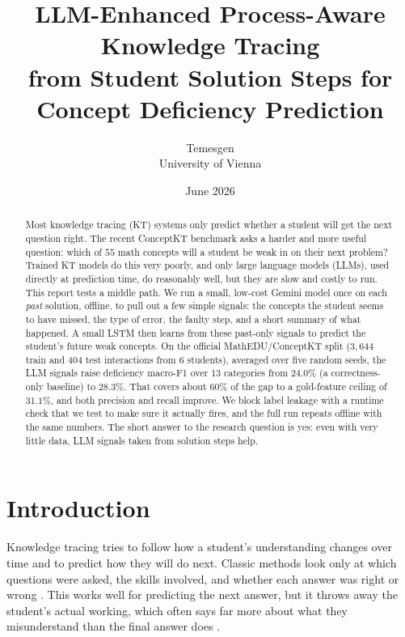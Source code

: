 \documentclass[11pt]{article}
\title{\bfseries LLM-Enhanced Process-Aware Knowledge Tracing\\
from Student Solution Steps for Concept Deficiency Prediction}
\author{Temesgen\\[2pt]
\normalsize University of Vienna}
\date{June 2026}
\begin{document}
\maketitle

\begin{abstract}
\noindent
Most knowledge tracing (KT) systems only predict whether a student will get the
next question right. The recent ConceptKT benchmark asks a harder and more useful
question: which of $55$ math concepts will a student be weak in on their next
problem? Trained KT models do this very poorly, and only large language models
(LLMs), used directly at prediction time, do reasonably well, but they are slow and
costly to run. This report tests a middle path. We run a small, low-cost Gemini model once on each
\emph{past} solution, offline, to pull out a few simple signals: the concepts the
student seems to have missed, the type of error, the faulty step, and a short
summary of what happened. A small LSTM then learns from these past-only signals to
predict the student's future weak concepts. On the official MathEDU/ConceptKT split
($3{,}644$ train and $404$ test interactions from $6$ students), averaged over five
random seeds, the LLM signals raise deficiency macro-F1 over $13$ categories from
$24.0\%$ (a correctness-only baseline) to $28.3\%$. That covers about $60\%$ of the
gap to a gold-feature ceiling of $31.1\%$, and both precision and recall improve. We
block label leakage with a runtime check that we test to make sure it actually fires,
and the full run repeats offline with the same numbers. The short answer to the
research question is yes: even with very little data, LLM signals taken from solution
steps help.
\end{abstract}

\section{Introduction}
Knowledge tracing tries to follow how a student's understanding changes over time and
to predict how they will do next. Classic methods look only at which questions were
asked, the skills involved, and whether each answer was right or wrong
\cite{piech2015dkt}. This works well for predicting the next answer, but it throws
away the student's actual working, which often says far more about what they
misunderstand than the final answer does \cite{huang2024remembering}.
\end{document}
